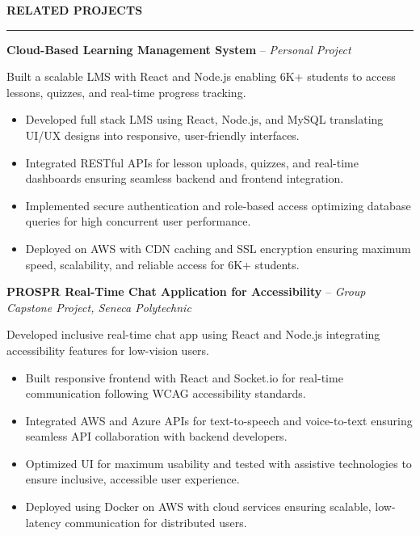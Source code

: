 \documentclass[10pt,letterpaper]{article}
\begin{document}
\vspace{6pt}

\textbf{RELATED PROJECTS}\\[-8pt]
\noindent\rule{\textwidth}{1pt}

\vspace{-2pt}

\textbf{Cloud-Based Learning Management System} -- \emph{Personal Project}

\vspace{-1pt}

Built a scalable LMS with React and Node.js enabling 6K+ students to access lessons, quizzes, and real-time progress tracking.
\vspace{-1pt}
\begin{itemize}
\item Developed full stack LMS using React, Node.js, and MySQL translating UI/UX designs into responsive, user-friendly interfaces.
\item Integrated RESTful APIs for lesson uploads, quizzes, and real-time dashboards ensuring seamless backend and frontend integration.
\item Implemented secure authentication and role-based access optimizing database queries for high concurrent user performance.
\item Deployed on AWS with CDN caching and SSL encryption ensuring maximum speed, scalability, and reliable access for 6K+ students.
\end{itemize}

\textbf{PROSPR  Real-Time Chat Application for Accessibility} -- \emph{Group Capstone Project, Seneca Polytechnic}

\vspace{-1pt}

Developed inclusive real-time chat app using React and Node.js integrating accessibility features for low-vision users.
\vspace{-1pt}
\begin{itemize}
\item Built responsive frontend with React and Socket.io for real-time communication following WCAG accessibility standards.
\item Integrated AWS and Azure APIs for text-to-speech and voice-to-text ensuring seamless API collaboration with backend developers.
\item Optimized UI for maximum usability and tested with assistive technologies to ensure inclusive, accessible user experience.
\item Deployed using Docker on AWS with cloud services ensuring scalable, low-latency communication for distributed users.
\end{itemize}
\end{document}
